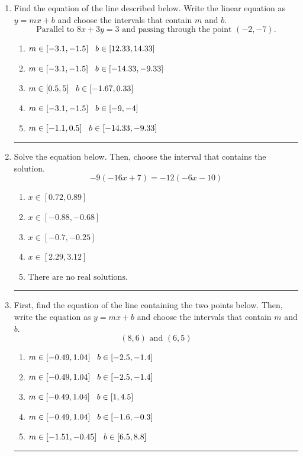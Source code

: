 \documentclass[14pt]{extbook}
\newcommand{\litem}[1]{\item#1\hspace*{-1cm}\rule{\textwidth}{0.4pt}}
\begin{document}
\begin{enumerate}
{\begin{enumerate}[label=\Alph*.]
\end{enumerate} }
\litem{
Find the equation of the line described below. Write the linear equation as $ y=mx+b $ and choose the intervals that contain $m$ and $b$.\[ \text{Parallel to } 8 x + 3 y = 3 \text{ and passing through the point } (-2, -7). \]\begin{enumerate}[label=\Alph*.]
\item \( m \in [-3.1, -1.5] \hspace*{3mm} b \in [12.33, 14.33] \)
\item \( m \in [-3.1, -1.5] \hspace*{3mm} b \in [-14.33, -9.33] \)
\item \( m \in [0.5, 5] \hspace*{3mm} b \in [-1.67, 0.33] \)
\item \( m \in [-3.1, -1.5] \hspace*{3mm} b \in [-9, -4] \)
\item \( m \in [-1.1, 0.5] \hspace*{3mm} b \in [-14.33, -9.33] \)

\end{enumerate} }
\litem{
Solve the equation below. Then, choose the interval that contains the solution.\[ -9(-16x + 7) = -12(-6x -10) \]\begin{enumerate}[label=\Alph*.]
\item \( x \in [0.72, 0.89] \)
\item \( x \in [-0.88, -0.68] \)
\item \( x \in [-0.7, -0.25] \)
\item \( x \in [2.29, 3.12] \)
\item \( \text{There are no real solutions.} \)

\end{enumerate} }
\litem{
First, find the equation of the line containing the two points below. Then, write the equation as $ y=mx+b $ and choose the intervals that contain $m$ and $b$.\[ (8, 6) \text{ and } (6, 5) \]\begin{enumerate}[label=\Alph*.]
\item \( m \in [-0.49, 1.04] \hspace*{3mm} b \in [-2.5, -1.4] \)
\item \( m \in [-0.49, 1.04] \hspace*{3mm} b \in [-2.5, -1.4] \)
\item \( m \in [-0.49, 1.04] \hspace*{3mm} b \in [1, 4.5] \)
\item \( m \in [-0.49, 1.04] \hspace*{3mm} b \in [-1.6, -0.3] \)
\item \( m \in [-1.51, -0.45] \hspace*{3mm} b \in [6.5, 8.8] \)


\end{enumerate}}
\end{enumerate}
\end{document}
